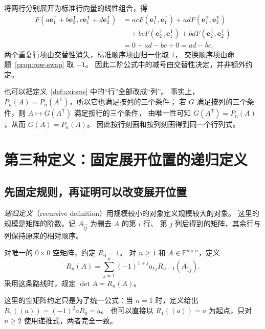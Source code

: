 \documentclass[UTF8,12pt,a4paper,fontset=fandol]{ctexart}
\begin{document}
\begin{solve}
将两行分别展开为标准行向量的线性组合，得
\begin{align*}
  F(a\mathbf e_1^{\mathsf T}+b\mathbf e_2^{\mathsf T},
    c\mathbf e_1^{\mathsf T}+d\mathbf e_2^{\mathsf T})
  &=acF(\mathbf e_1^{\mathsf T},\mathbf e_1^{\mathsf T})
    +adF(\mathbf e_1^{\mathsf T},\mathbf e_2^{\mathsf T})\\
  &\quad+bcF(\mathbf e_2^{\mathsf T},\mathbf e_1^{\mathsf T})
    +bdF(\mathbf e_2^{\mathsf T},\mathbf e_2^{\mathsf T})\\
  &=0+ad-bc+0=ad-bc.
\end{align*}
两个重复行项由交替性消失，标准顺序项由归一化取 $1$，
交换顺序项由命题~\ref{prop:row-swap} 取 $-1$。
因此二阶公式中的减号由交替性决定，并非额外约定。
\end{solve}

也可以把定义~\ref{def:axioms} 中的“行”全部改成“列”。
事实上，$P_n(A)=P_n(A^{\mathsf T})$，所以它也满足按列的三个条件；
若 $G$ 满足按列的三个条件，则 $A\mapsto G(A^{\mathsf T})$ 满足按行的三个条件，
由唯一性可知 $G(A^{\mathsf T})=P_n(A)$，从而 $G(A)=P_n(A)$。
因此按行刻画和按列刻画得到同一个行列式。

\section{第三种定义：固定展开位置的递归定义}
\label{sec:recursive-definition}

\subsection{先固定规则，再证明可以改变展开位置}

\emph{递归定义}（recursive definition）用规模较小的对象定义规模较大的对象。
这里的规模是矩阵的阶数。记 $A_{\widehat i\widehat j}$ 为删去 $A$ 的第 $i$ 行、
第 $j$ 列后得到的矩阵，其余行与列保持原来的相对顺序。

\begin{definition}[按第一行递归定义]
\label{def:recursive-determinant}
对唯一的 $0\times0$ 空矩阵，约定 $R_0=1$。
对 $n\geq1$ 和 $A\in\mathbb F^{n\times n}$，定义
\begin{equation}
  R_n(A)=\sum_{j=1}^{n}(-1)^{1+j}a_{1j}
  R_{n-1}(A_{\widehat1\widehat j}).
  \label{eq:recursive-definition}
\end{equation}
采用这条路线时，规定 $\det A=R_n(A)$。
\end{definition}

这里的空矩阵约定只是为了统一公式：当 $n=1$ 时，定义给出
$R_1((a))=(-1)^2aR_0=a$。
也可以直接以 $R_1((a))=a$ 为起点，只对 $n\geq2$ 使用递推式，两者完全一致。
\end{document}
